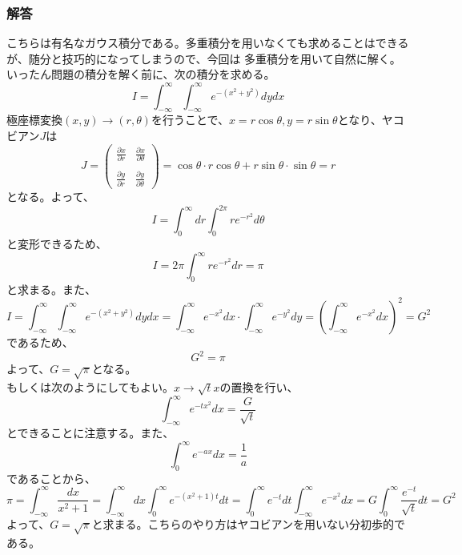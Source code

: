 \documentclass[a4j,dvipdfmx]{jsarticle}
\begin{document}
\subsubsection*{解答}
こちらは有名なガウス積分である。多重積分を用いなくても求めることはできるが、随分と技巧的になってしまうので、今回は
多重積分を用いて自然に解く。いったん問題の積分を解く前に、次の積分を求める。
\begin{equation*}
    I=\int_{-\infty}^{\infty}\int_{-\infty}^{\infty}e^{-(x^2+y^2)}dy dx
\end{equation*}
極座標変換$(x,y)\to(r,\theta)$を行うことで、$x=r\cos\theta,y=r\sin\theta$となり、ヤコビアン$J$は
\begin{equation*}
    J=\begin{pmatrix}
        \displaystyle \frac{\partial x}{\partial r} & \displaystyle \frac{\partial x}{\partial \theta} \\\\
        \displaystyle \frac{\partial y}{\partial r} & \displaystyle \frac{\partial y}{\partial \theta}
     \end{pmatrix}
    =\cos\theta\cdot r\cos\theta + r\sin\theta\cdot\sin\theta =r
\end{equation*}
となる。よって、
\begin{equation*}
    I=\int_0^\infty dr\int_0^{2\pi}re^{-r^2}d\theta
\end{equation*}
と変形できるため、
\begin{equation*}
    I=2\pi\int_0^\infty re^{-r^2}dr=\pi 
\end{equation*}
と求まる。また、
\begin{equation*}
    I=\int_{-\infty}^{\infty}\int_{-\infty}^{\infty}e^{-(x^2+y^2)}dy dx=\int_{-\infty}^\infty e^{-x^2}dx\cdot\int_{-\infty}^\infty e^{-y^2}dy=\left(\int_{-\infty}^{\infty}e^{-x^2}dx\right)^2=G^2
\end{equation*}
であるため、
\begin{equation*}
    G^2=\pi
\end{equation*}
よって、$G=\sqrt{\pi}$となる。\\

もしくは次のようにしてもよい。$x\to\sqrt{t}x$の置換を行い、
\begin{equation*}
    \int_{-\infty}^{\infty}e^{-tx^2}dx=\frac{G}{\sqrt{t}}
\end{equation*}
とできることに注意する。また、
\begin{equation*}
    \int_0^{\infty}e^{-ax}dx=\frac{1}{a}
\end{equation*}
であることから、
\begin{equation*}
    \pi=\int_{-\infty}^{\infty}\frac{dx}{x^2+1}=\int_{-\infty}^{\infty}dx\int_0^{\infty}e^{-(x^2+1)t}dt=
    \int_{0}^{\infty}e^{-t}dt\int_{-\infty}^{\infty}e^{-x^2}dx=G\int_{0}^\infty\frac{e^{-t}}{\sqrt{t}}dt=G^2
\end{equation*}
よって、$G=\sqrt{\pi}$と求まる。こちらのやり方はヤコビアンを用いない分初歩的である。
\newpage
\end{document}
